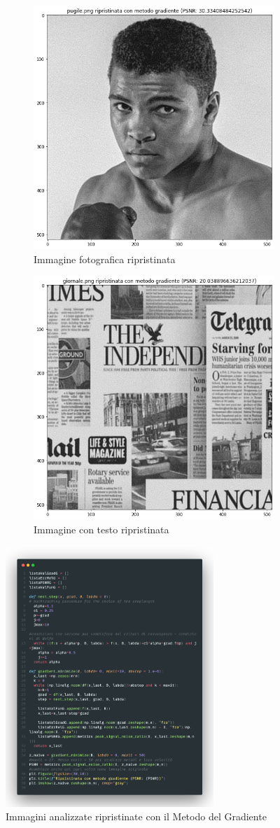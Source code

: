 \begin{figure}[H]
    \begin{subfigure}{0.5\textwidth}
        \centering
    \includegraphics[width=0.6\linewidth]{imgRel/fotogrmg.png}
    \caption{Immagine fotografica ripristinata}
    \label{fig:pugilegradiente}
    \end{subfigure}%
    \begin{subfigure}{0.5\textwidth}\centering
        \includegraphics[width=0.6\linewidth]{imgRel/giornalemg.png}
        \caption{Immagine con testo ripristinata}
    \end{subfigure}
\caption{Immagini analizzate ripristinate con il Metodo del Gradiente}
    \centering
    \includegraphics[width=0.7\textwidth]{imgCode/metGrad.png}

\end{figure}
